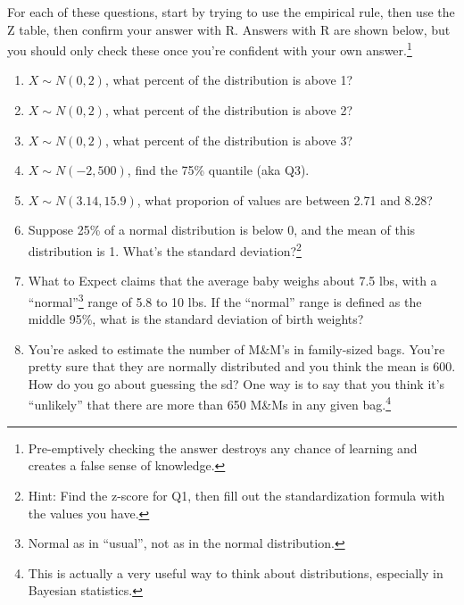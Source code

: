 \documentclass[
  letterpaper,
  DIV=11,
  numbers=noendperiod]{scrreprt}
\providecommand{\tightlist}{%
  \setlength{\itemsep}{0pt}\setlength{\parskip}{0pt}}\usepackage{longtable,booktabs,array}
\begin{document}
For each of these questions, start by trying to use the empirical rule,
then use the Z table, then confirm your answer with R. Answers with R
are shown below, but you should only check these once you're confident
with your own answer.\footnote{Pre-emptively checking the answer
  destroys any chance of learning and creates a false sense of
  knowledge.}

\begin{enumerate}
\def\labelenumi{\arabic{enumi}.}
\tightlist
\item
  \(X \sim N(0,2)\), what percent of the distribution is above 1?
\item
  \(X \sim N(0,2)\), what percent of the distribution is above 2?
\item
  \(X \sim N(0,2)\), what percent of the distribution is above 3?
\item
  \(X \sim N(-2, 500)\), find the 75\% quantile (aka Q3).
\item
  \(X \sim N(3.14, 15.9)\), what proporion of values are between 2.71
  and 8.28?
\item
  Suppose 25\% of a normal distribution is below 0, and the mean of this
  distribution is 1. What's the standard deviation?\footnote{Hint: Find
    the z-score for Q1, then fill out the standardization formula with
    the values you have.}
\item
  What to Expect claims that the average baby weighs about 7.5 lbs, with
  a ``normal''\footnote{Normal as in ``usual'', not as in the normal
    distribution.} range of 5.8 to 10 lbs. If the ``normal'' range is
  defined as the middle 95\%, what is the standard deviation of birth
  weights?
\item
  You're asked to estimate the number of M\&M's in family-sized bags.
  You're pretty sure that they are normally distributed and you think
  the mean is 600. How do you go about guessing the sd? One way is to
  say that you think it's ``unlikely'' that there are more than 650
  M\&Ms in any given bag.\footnote{This is actually a very useful way to
    think about distributions, especially in Bayesian statistics.}


\end{enumerate}
\end{document}
